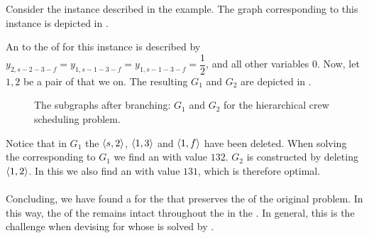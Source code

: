 \begin{example}
Consider the instance described in the example. The graph corresponding to
this instance is depicted in .
\end{example}

An  to the  of  for this instance is described by $y_{2,s-2-3-f}=y_{1,s-1-3-f}=y_{1,s-1-3-f}=\dfrac{1}{2}$, and all other variables $0$. Now, let $1,2$ be a pair of  that we  on. The resulting  $G_1$ and $G_2$ are depicted in .

\begin{figure}[hbt]
\centering
{}
\caption{The subgraphs after branching: $G_1$ and $G_2$ for the hierarchical crew scheduling problem.}
\end{figure}

Notice that in $G_1$ the  $\left\langle s,2 \right\rangle$, $\left\langle 1,3 \right\rangle$ and $\left\langle 1,f \right\rangle$ have been deleted. When solving the  corresponding to $G_1$ we find an  with value $132$. $G_2$ is constructed by deleting  $\left\langle 1,2 \right\rangle$. In this  we also find an  with value $131$, which is therefore optimal.

\paragraph{}
Concluding, we have found a  for the  that preserves the  of the original problem. In this way, the  of the  remains intact throughout the  in the . In general, this is the challenge when devising  for  whose  is solved by .

